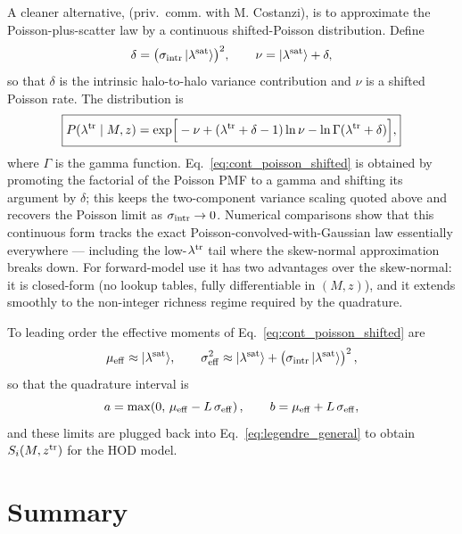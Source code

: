 \documentclass[a4paper, 11pt]{article}
\newcommand{\ltr}{\lambda^{\rm tr}}
\newcommand{\ztr}{z^{\rm tr}}
\begin{document}
A cleaner alternative, (priv.\ comm. with M. Costanzi), is to approximate the Poisson-plus-scatter law by a continuous shifted-Poisson distribution. Define
\begin{equation}
\delta = \big(\sigma_{\rm intr}\,|\lambda^{\rm sat}\rangle\big)^{2},
\qquad
\nu = |\lambda^{\rm sat}\rangle + \delta,
\label{eq:delta_nu}
\end{equation}
so that $\delta$ is the intrinsic halo-to-halo variance contribution and $\nu$ is a shifted Poisson rate. The distribution is
\begin{equation}
\boxed{
P(\ltr\mid M,z)
=
\exp\!\Big[
-\nu
+(\ltr+\delta-1)\ln\nu
-\ln\Gamma(\ltr+\delta)
\Big],
}
\label{eq:cont_poisson_shifted}
\end{equation}
where $\Gamma$ is the gamma function. Eq.~\eqref{eq:cont_poisson_shifted} is obtained by promoting the factorial of the Poisson PMF to a gamma and shifting its argument by $\delta$; this keeps the two-component variance scaling quoted above and recovers the Poisson limit as $\sigma_{\rm intr}\to 0$. Numerical comparisons show that this continuous form tracks the exact Poisson-convolved-with-Gaussian law essentially everywhere --- including the low-$\ltr$ tail where the skew-normal approximation breaks down. For forward-model use it has two advantages over the skew-normal: it is closed-form (no lookup tables, fully differentiable in $(M,z)$), and it extends smoothly to the non-integer richness regime required by the quadrature.

To leading order the effective moments of Eq.~\eqref{eq:cont_poisson_shifted} are
\begin{equation}
\mu_{\rm eff}\approx |\lambda^{\rm sat}\rangle,
\qquad
\sigma_{\rm eff}^{2}
\approx
|\lambda^{\rm sat}\rangle
+
\left(\sigma_{\rm intr}\,|\lambda^{\rm sat}\rangle\right)^{2},
\label{eq:mu_sigma_hod}
\end{equation}
so that the quadrature interval is
\begin{equation}
a=\max\!\left(0,\,\mu_{\rm eff}-L\,\sigma_{\rm eff}\right),
\qquad
b=\mu_{\rm eff}+L\,\sigma_{\rm eff},
\label{eq:ab_hod}
\end{equation}
and these limits are plugged back into Eq.~\eqref{eq:legendre_general} to obtain $S_i(M,\ztr)$ for the HOD model.

\section{Summary}
\end{document}
